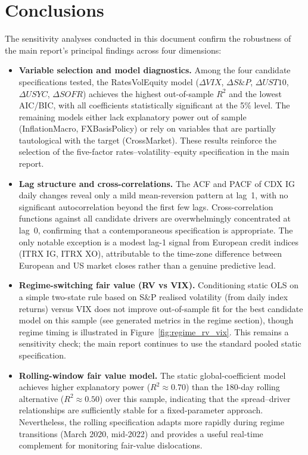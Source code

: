 \section{Conclusions}

The sensitivity analyses conducted in this document confirm the robustness of
the main report's principal findings across four dimensions:

\begin{itemize}
  \item \textbf{Variable selection and model diagnostics.} Among the four
    candidate specifications tested, the RatesVolEquity model (\(\Delta VIX\),
    \(\Delta S\&P\), \(\Delta UST10\), \(\Delta USYC\), \(\Delta SOFR\))
    achieves the highest out-of-sample \(R^2\) and the lowest AIC/BIC,
    with all coefficients statistically significant at the 5\% level. The
    remaining models either lack explanatory power out of sample
    (InflationMacro, FXBasisPolicy) or rely on variables that are partially
    tautological with the target (CrossMarket). These results reinforce the
    selection of the five-factor rates--volatility--equity specification in the
    main report.

  \item \textbf{Lag structure and cross-correlations.} The ACF and PACF of
    CDX IG daily changes reveal only a mild mean-reversion pattern at lag~1,
    with no significant autocorrelation beyond the first few lags.
    Cross-correlation functions against all candidate drivers are
    overwhelmingly concentrated at lag~0, confirming that a contemporaneous
    specification is appropriate. The only notable exception is a modest
    lag-1 signal from European credit indices (ITRX IG, ITRX XO), attributable
    to the time-zone difference between European and US market closes rather
    than a genuine predictive lead.

  \item \textbf{Regime-switching fair value (RV vs VIX).} Conditioning static
    OLS on a simple two-state rule based on S\&P realised volatility (from
    daily index returns) versus VIX
    does not improve out-of-sample fit for the best candidate model on this
    sample (see generated metrics in the regime section), though regime timing is
    illustrated in Figure~\ref{fig:regime_rv_vix}.
    This remains a sensitivity check; the main report continues to use the
    standard pooled static specification.

  \item \textbf{Rolling-window fair value model.} The static
    global-coefficient model achieves higher explanatory power
    (\(R^2 \approx 0.70\)) than the 180-day rolling alternative
    (\(R^2 \approx 0.50\)) over this sample, indicating that the
    spread--driver relationships are sufficiently stable for a fixed-parameter
    approach. Nevertheless, the rolling specification adapts more rapidly during
    regime transitions (March 2020, mid-2022) and provides a useful real-time
    complement for monitoring fair-value dislocations.
\end{itemize}

